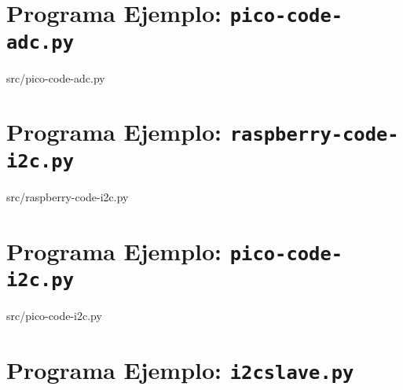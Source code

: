 
%
%

\cleardoublepage{}
\section{Programa Ejemplo: \texttt{pico-code-adc.py}}%
\label{sec:appendix1}
%
{src/pico-code-adc.py}

\cleardoublepage{}
\section{Programa Ejemplo: \texttt{raspberry-code-i2c.py}}%
\label{sec:appendix2}
%
{src/raspberry-code-i2c.py}

\cleardoublepage{}
\section{Programa Ejemplo: \texttt{pico-code-i2c.py}}%
\label{sec:appendix3}
%
{src/pico-code-i2c.py}

\cleardoublepage{}
\section{Programa Ejemplo: \texttt{i2cslave.py}}%
\label{sec:appendix4}
